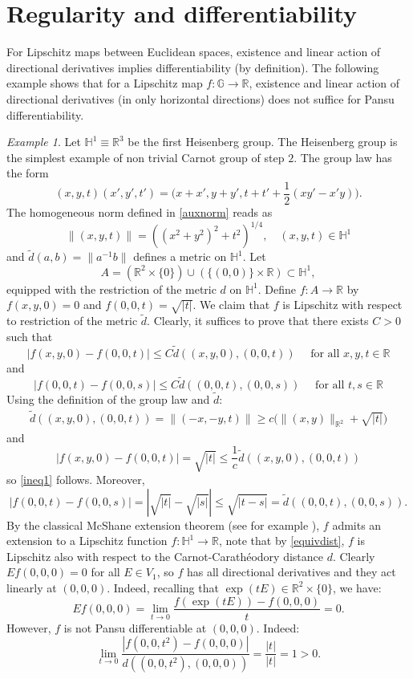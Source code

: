 \documentclass[reqno, 11pt]{amsart}
\theoremstyle{definition}
\theoremstyle{remark}
\newtheorem{example}[theorem]{Example}
\numberwithin{theorem}{section}
\numberwithin{equation}{section}
\begin{document}
\section{Regularity and differentiability}

For Lipschitz maps between Euclidean spaces, existence and linear action of directional derivatives implies differentiability (by definition). The following example shows that for a Lipschitz map $f\colon \mathbb{G}\to \mathbb{R}$, existence and linear action of directional derivatives (in only horizontal directions) does not suffice for Pansu differentiability.

\begin{example}\label{linearnotdiff}
Let $\mathbb{H}^{1}\equiv \mathbb{R}^3$ be the first Heisenberg group. The Heisenberg group is the simplest example of non trivial Carnot group of step $2$. The group law has the form
\[
(x,y,t)(x',y',t')=\Big(x+x', y+y', t+t'+\frac{1}{2}(xy'-x'y)\Big).
\]
The homogeneous norm defined in \eqref{auxnorm} reads as
\[ \| (x,y,t)\| = ((x^2+y^2)^2 + t^2)^{1/4},\quad (x,y,t)\in \mathbb{H}^1\]
and $\tilde{d}(a,b)=\|a^{-1}b\|$ defines a metric on $\mathbb{H}^{1}$.
Let
\[ A= (\mathbb{R}^{2}\times \{0\})\cup (\{(0,0)\}\times \mathbb{R})\subset \mathbb{H}^{1},\]
equipped with the restriction of the metric $d$ on $\mathbb{H}^{1}$. Define $f\colon A\to \mathbb{R}$ by $f(x,y,0)=0$ and $f(0,0,t)=\sqrt{|t|}$. We claim that $f$ is Lipschitz with respect to restriction of the metric $\tilde{d}$. Clearly, it suffices to prove that there exists $C>0$ such that
\begin{equation}\label{ineq1}
|f(x,y,0)-f(0,0,t)|\leq C \tilde{d}((x,y,0),(0,0,t))\quad \mbox{ for all } x,y,t\in\mathbb{R}
\end{equation}
and
\begin{equation}\label{ineq2}
|f(0,0,t)-f(0,0,s)|\leq C \tilde{d}((0,0,t),(0,0,s))\quad \mbox{ for all } t,s\in\mathbb{R}
\end{equation}
Using the definition of the group law and $\tilde{d}$:
\begin{align*}
\tilde{d}((x,y,0),(0,0,t)) =\|(-x,-y,t)\| \geq c \big(\|(x,y)\|_{\mathbb{R}^2}+ \sqrt{|t|}\big)
\end{align*}
and
\[|f(x,y,0)-f(0,0,t)|= \sqrt{|t|} \leq \frac{1}{c} \tilde{d}((x,y,0),(0,0,t))\]
so \eqref{ineq1} follows.
Moreover,
\[
|f(0,0,t)-f(0,0,s)|=\left|\sqrt{|t|}-\sqrt{|s|}\right| \leq \sqrt{|t-s|}= \tilde{d}((0,0,t),(0,0,s)).
\]
By the classical McShane extension theorem (see for example \cite[Theorem 6.2]{Hei01}), $f$ admits an extension to a Lipschitz function $f\colon \mathbb{H}^{1}\to \mathbb{R}$, note that by \eqref{equivdist}, $f$ is Lipschitz also with respect to the Carnot-Carath\'eodory distance $d$. Clearly $Ef(0,0,0)=0$ for all $E\in V_{1}$, so $f$ has all directional derivatives and they act linearly at $(0,0,0)$. Indeed, recalling that $\exp(tE)\in \mathbb{R}^2\times\{0\}$, we have:
\[
Ef(0,0,0)=\lim_{t\to 0}\frac{f(\exp(tE))-f(0,0,0)}{t}=0.
\]
However, $f$ is not Pansu differentiable at $(0,0,0)$. Indeed:
\[ \lim_{t \to 0} \frac{|f(0,0,t^2)-f(0,0,0)|}{d((0,0,t^2),(0,0,0))} = \frac{|t|}{|t|}=1>0.\]
\end{example}
\end{document}
